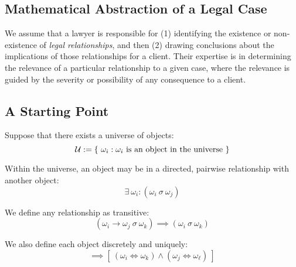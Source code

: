 \documentclass{article}
\numberwithin{equation}{section}
\begin{document}
\subsection{Mathematical Abstraction of a Legal Case}


We assume that a lawyer is responsible for (1) identifying the existence or non-existence of \textit{legal relationships}, and then (2) drawing conclusions about the implications of those relationships for a client. Their expertise is in determining the relevance of a particular relationship to a given case, where the relevance is guided by the severity or possibility of any consequence to a client.


\subsection{A Starting Point}

Suppose that there exists a universe of objects:
\begin{equation}
	\mathcal{U} := \{ \ \omega_i : \omega_i \ \text{is an object in the universe} \ \} \\
\end{equation}

Within the universe, an object may be in a directed, pairwise relationship with another object:
\begin{equation}
	\exists \ \omega_i : (\omega_i \ \sigma \ \omega_j) 
\end{equation}

We define any relationship as transitive:
\begin{equation}
	(\omega_i \rightarrow \omega_j \ \sigma \ \omega_k) \implies (\omega_i \ \sigma \ \omega_k)
\end{equation}

We also define each object discretely and uniquely: 
\begin{equation}
		[ \ (\omega_i \ \sigma \ \omega_j) = (\omega_k \ \sigma \ \omega_{\ell}) \ ] \implies [ \ (\omega_i \iff \omega_k) \land (\omega_j \iff \omega_{\ell}) \ ]
\end{equation}
\end{document}
